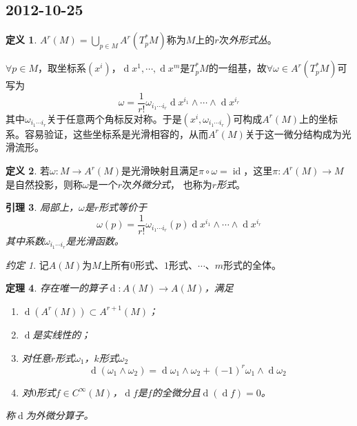 \documentclass[winfonts,UTF8,c5size,a4paper,fancyhdr,hyperref,titlepage,nocap]{ctexart}
\newtheorem{thm}{定理}
\newtheorem{lem}[thm]{引理}
\theoremstyle{definition}
\newtheorem{defn}[thm]{定义}
\theoremstyle{remark}
\newtheorem*{note}{约定}
\numberwithin{equation}{subsection}
\newcommand{\red}{\color{red}}
\newcommand{\dd}{\operatorname{d}}
\newcommand{\id}{\operatorname{id}}
\begin{document}
\subsection*{2012-10-25}
\begin{defn}
  $A^r(M)=\bigcup\limits_{p\in M}A^r(T^{\ast}_pM)$称为$M$上的$r$次\emph{\red 外形式丛}。
\end{defn}
$\forall p\in M$，取坐标系$(x^i)$，$\dd x^1,\cdots,\dd x^m$是$T^{\ast}_pM$的一组基，故$\forall \omega\in A^r(T^{\ast}_pM)$可写为
\begin{equation*}
\omega=\frac{1}{r!}\omega_{i_1\cdots i_r}\dd x^{i_1}\wedge\cdots\wedge\dd x^{i_r}
\end{equation*}
其中$\omega_{i_1\cdots i_r}$关于任意两个角标反对称。于是$(x^i,\omega_{i_1\cdots i_r})$可构成$A^r(M)$上的坐标系。容易验证，这些坐标系是光滑相容的，从而$A^r(M)$关于这一微分结构成为光滑流形。
\begin{defn}
  若$\omega\colon M\to A^r(M)$是光滑映射且满足$\pi\circ\omega=\id$，这里$\pi\colon A^r(M)\to M$是自然投影，则称$\omega$是一个$r$次\emph{\red 外微分式}，
  也称为\emph{\red $r$形式}。
\end{defn}
\begin{lem}
  局部上，$\omega$是$r$形式等价于
\begin{equation*}
\omega(p)=\frac{1}{r!}\omega_{i_1\cdots i_r}(p)\dd x^{i_1}\wedge\cdots\wedge\dd x^{i_r}
\end{equation*}
其中系数$\omega_{i_1\cdots i_r}$是光滑函数。
\end{lem}
\begin{note}
  记$A(M)$为$M$上所有$0$形式、$1$形式、$\cdots$、$m$形式的全体。
\end{note}
\begin{thm}
  存在唯一的算子$\dd\colon A(M)\to A(M)$，满足
\begin{enumerate}[1)]
    \setlength{\itemindent}{2ex}
    \item $\dd(A^r(M))\subset A^{r+1}(M)$；
    \item $\dd$是实线性的；
    \item 对任意$r$形式$\omega_1$，$k$形式$\omega_2$
    \begin{equation*}
    \dd(\omega_1\wedge\omega_2)=\dd\omega_1\wedge\omega_2+(-1)^r\omega_1\wedge\dd\omega_2
    \end{equation*}
    \item 对$0$形式$f\in C^{\infty}(M)$，$\dd f$是$f$的全微分且$\dd(\dd f)=0$。
\end{enumerate}
称$\dd$为{\red 外微分算子}。
\end{thm}
\end{document}
